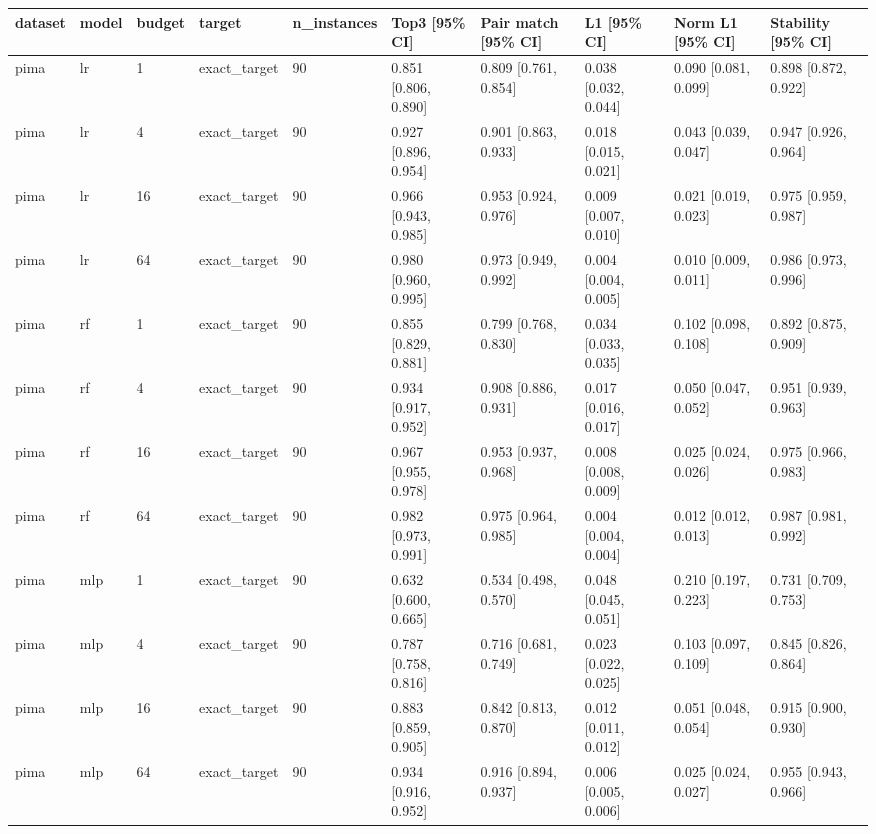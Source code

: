 \begin{tabular}{llllllllll}
\toprule
dataset & model & budget & target & n\_instances & Top3 [95\% CI] & Pair match [95\% CI] & L1 [95\% CI] & Norm L1 [95\% CI] & Stability [95\% CI] \\
\midrule
pima & lr & 1 & exact\_target & 90 & 0.851 [0.806, 0.890] & 0.809 [0.761, 0.854] & 0.038 [0.032, 0.044] & 0.090 [0.081, 0.099] & 0.898 [0.872, 0.922] \\
pima & lr & 4 & exact\_target & 90 & 0.927 [0.896, 0.954] & 0.901 [0.863, 0.933] & 0.018 [0.015, 0.021] & 0.043 [0.039, 0.047] & 0.947 [0.926, 0.964] \\
pima & lr & 16 & exact\_target & 90 & 0.966 [0.943, 0.985] & 0.953 [0.924, 0.976] & 0.009 [0.007, 0.010] & 0.021 [0.019, 0.023] & 0.975 [0.959, 0.987] \\
pima & lr & 64 & exact\_target & 90 & 0.980 [0.960, 0.995] & 0.973 [0.949, 0.992] & 0.004 [0.004, 0.005] & 0.010 [0.009, 0.011] & 0.986 [0.973, 0.996] \\
pima & rf & 1 & exact\_target & 90 & 0.855 [0.829, 0.881] & 0.799 [0.768, 0.830] & 0.034 [0.033, 0.035] & 0.102 [0.098, 0.108] & 0.892 [0.875, 0.909] \\
pima & rf & 4 & exact\_target & 90 & 0.934 [0.917, 0.952] & 0.908 [0.886, 0.931] & 0.017 [0.016, 0.017] & 0.050 [0.047, 0.052] & 0.951 [0.939, 0.963] \\
pima & rf & 16 & exact\_target & 90 & 0.967 [0.955, 0.978] & 0.953 [0.937, 0.968] & 0.008 [0.008, 0.009] & 0.025 [0.024, 0.026] & 0.975 [0.966, 0.983] \\
pima & rf & 64 & exact\_target & 90 & 0.982 [0.973, 0.991] & 0.975 [0.964, 0.985] & 0.004 [0.004, 0.004] & 0.012 [0.012, 0.013] & 0.987 [0.981, 0.992] \\
pima & mlp & 1 & exact\_target & 90 & 0.632 [0.600, 0.665] & 0.534 [0.498, 0.570] & 0.048 [0.045, 0.051] & 0.210 [0.197, 0.223] & 0.731 [0.709, 0.753] \\
pima & mlp & 4 & exact\_target & 90 & 0.787 [0.758, 0.816] & 0.716 [0.681, 0.749] & 0.023 [0.022, 0.025] & 0.103 [0.097, 0.109] & 0.845 [0.826, 0.864] \\
pima & mlp & 16 & exact\_target & 90 & 0.883 [0.859, 0.905] & 0.842 [0.813, 0.870] & 0.012 [0.011, 0.012] & 0.051 [0.048, 0.054] & 0.915 [0.900, 0.930] \\
pima & mlp & 64 & exact\_target & 90 & 0.934 [0.916, 0.952] & 0.916 [0.894, 0.937] & 0.006 [0.005, 0.006] & 0.025 [0.024, 0.027] & 0.955 [0.943, 0.966] \\

\end{tabular}
